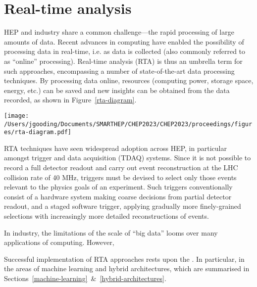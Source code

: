 \section{Real-time analysis}
\label{rta}
HEP and industry share a common challenge—the rapid processing of large amounts of data. \cite{hu-big-data} Recent advances in computing have enabled the possibility of processing data in real-time, i.e. as data is collected (also commonly referred to as ``online'' processing). \cite{real-time-computing} Real-time analysis (RTA) is thus an umbrella term for such approaches, encompassing a number of state-of-the-art data processing techniques. By processing data online, resources (computing power, storage space, energy, etc.) can be saved and new insights can be obtained from the data recorded, as shown in Figure~\ref{rta-diagram}.\par


\begin{figure*}[h!]
    \centering
    \texttt{[image: /Users/jgooding/Documents/SMARTHEP/CHEP2023/CHEP2023/proceedings/figures/rta-diagram.pdf]}
    \caption{Traditional and real-time analysis approaches to data processing. Traditional approaches rely on recording all data and processing this offilne. Real-time analysis applies the reverse approach, processing data as it is produced, recording only the relevant processed information, enabling larger volumes of processed data to be stored.}
    \label{rta-diagram}       %
\end{figure*}
RTA techniques have seen widespread adoption across HEP, in particular amongst trigger and data acquisition (TDAQ) systems. Since it is not possible to record a full detector readout and carry out event reconstruction at the LHC collision rate of {40}{ MHz}, triggers must be devised to select only those events relevant to the physics goals of an experiment. Such triggers conventionally consist of a hardware system making coarse decisions from partial detector readout, and a staged software trigger, applying gradually more finely-grained selections with increasingly more detailed reconstructions of events.\par
In industry, the limitations of the scale of ``big data'' looms over many applications of computing. However, \par
Successful implementation of RTA approaches rests upon the . In particular, in the areas of machine learning and hybrid architectures, which are summarised in Sections~\ref{machine-learning}~\&~\ref{hybrid-architectures}.

